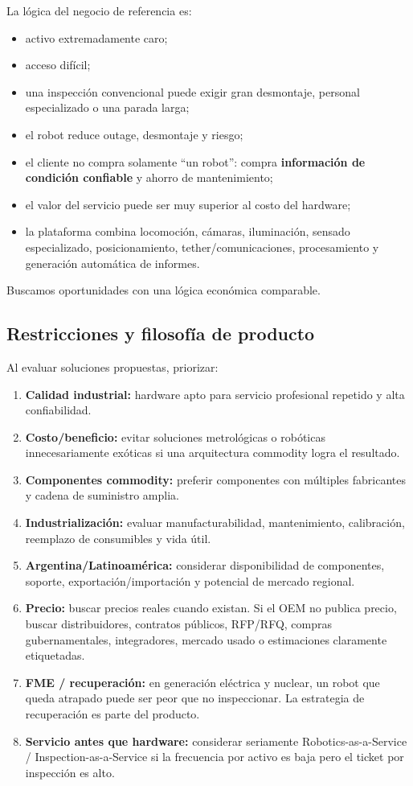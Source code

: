 \documentclass[11pt,a4paper]{article}
\begin{document}
La lógica del negocio de referencia es:

\begin{itemize}
\item activo extremadamente caro;
\item acceso difícil;
\item una inspección convencional puede exigir gran desmontaje, personal especializado o una parada larga;
\item el robot reduce outage, desmontaje y riesgo;
\item el cliente no compra solamente ``un robot'': compra \textbf{información de condición confiable} y ahorro de mantenimiento;
\item el valor del servicio puede ser muy superior al costo del hardware;
\item la plataforma combina locomoción, cámaras, iluminación, sensado especializado, posicionamiento, tether/comunicaciones, procesamiento y generación automática de informes.
\end{itemize}

Buscamos oportunidades con una lógica económica comparable.


\subsection*{Restricciones y filosofía de producto}
Al evaluar soluciones propuestas, priorizar:

\begin{enumerate}
\item \textbf{Calidad industrial:} hardware apto para servicio profesional repetido y alta confiabilidad.
\item \textbf{Costo/beneficio:} evitar soluciones metrológicas o robóticas innecesariamente exóticas si una arquitectura commodity logra el resultado.
\item \textbf{Componentes commodity:} preferir componentes con múltiples fabricantes y cadena de suministro amplia.
\item \textbf{Industrialización:} evaluar manufacturabilidad, mantenimiento, calibración, reemplazo de consumibles y vida útil.
\item \textbf{Argentina/Latinoamérica:} considerar disponibilidad de componentes, soporte, exportación/importación y potencial de mercado regional.
\item \textbf{Precio:} buscar precios reales cuando existan. Si el OEM no publica precio, buscar distribuidores, contratos públicos, RFP/RFQ, compras gubernamentales, integradores, mercado usado o estimaciones claramente etiquetadas.
\item \textbf{FME / recuperación:} en generación eléctrica y nuclear, un robot que queda atrapado puede ser peor que no inspeccionar. La estrategia de recuperación es parte del producto.
\item \textbf{Servicio antes que hardware:} considerar seriamente Robotics-as-a-Service / Inspection-as-a-Service si la frecuencia por activo es baja pero el ticket por inspección es alto.
\end{enumerate}
\end{document}
